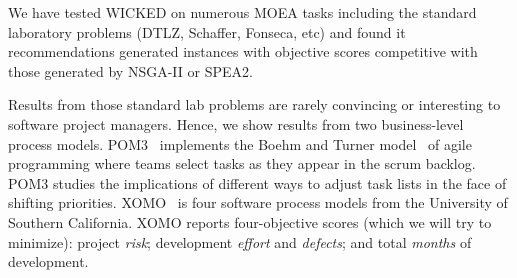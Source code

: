 
We have tested WICKED on numerous MOEA tasks
including the standard laboratory problems (DTLZ, Schaffer, Fonseca, etc) and found
it recommendations generated instances with objective scores competitive with
those generated by NSGA-II or SPEA2. 

Results from those standard lab problems
are rarely convincing or interesting to software project managers. Hence, we show
results from two business-level process models.
POM3~\cite{port08,me09j}  implements the Boehm and Turner model~\cite{port08,1204376,turner03}
of agile programming
where teams select tasks as they appear in the scrum backlog.
POM3 studies the implications of different ways to adjust task lists in the face of shifting priorities.
XOMO~\cite{me07f,me09a,me09e}
is four software process models from
the University of Southern California.
XOMO reports four-objective scores (which we will try to minimize):
project {\em risk};
development {\em effort} and {\em defects}; and total {\em months} of development.


